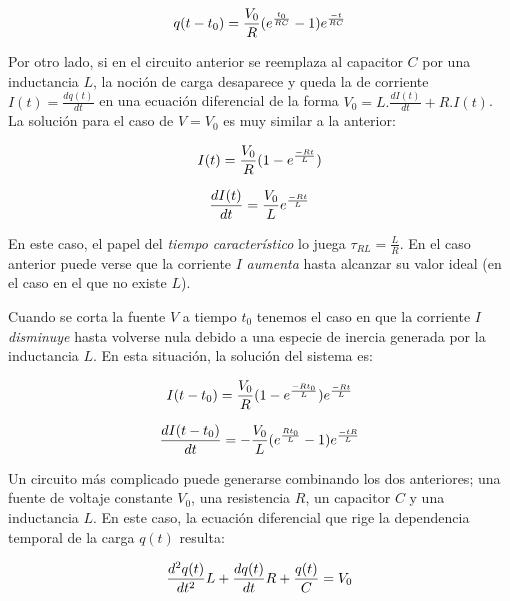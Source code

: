 \documentclass[11pt,a4paper]{article}
\begin{document}
\begin{equation}{\label{RC_descarga_I}}
q(t-t_{0}) = \frac{V_{0}}{R}(e^\frac{t_{0}}{RC}-1)e^\frac{-t}{RC}
\end{equation}

Por otro lado, si en el circuito anterior se reemplaza al capacitor $C$ por una inductancia $L$, la noción de carga desaparece y queda la de corriente $I(t) = \frac{dq(t)}{dt}$ en una ecuación diferencial de la forma $V_{0} = L.\frac{dI(t)}{dt}+R.I(t)$. La solución para el caso de $V= V_0$ es muy similar a la anterior:

\begin{equation}{\label{RL_carga_I}}
I(t)=\frac{V_0}{R}(1-e^\frac{-Rt}{L})
\end{equation}

\begin{equation}{\label{RL_carga}}
\dfrac{dI(t)}{dt}=\frac{V_{0}}{L}e^\frac{-Rt}{L}
\end{equation}

En este caso, el papel del \textit{tiempo característico} lo juega $\tau_{RL}=\frac{L}{R}$. En el caso anterior puede verse que la corriente $I$ \textit{aumenta} hasta alcanzar su valor ideal (en el caso en el que no existe $L$).

Cuando se corta la fuente $V$ a tiempo $t_{0}$ tenemos el caso en que la corriente $I$ \textit{disminuye} hasta volverse nula debido a una especie de inercia generada por la inductancia $L$. En esta situación, la solución del sistema es: 

\begin{equation}{\label{RL_descarga_I}}
I(t-t_0)= \frac{V_{0}}{R}(1-e^\frac{-Rt_0}{L})e^\frac{-Rt}{L}
\end{equation}

\begin{equation}{\label{RL_descarga}}
\dfrac{dI(t-t_{0})}{dt}=-\frac{V_{0}}{L}(e^\frac{Rt_{0}}{L}-1)e^\frac{-tR}{L}
\end{equation}


Un circuito más complicado puede generarse combinando los dos anteriores; una fuente de voltaje constante $V_0$, una resistencia $R$, un capacitor $C$ y una inductancia $L$. En este caso, la ecuación diferencial que rige la dependencia temporal de la carga $q(t)$ resulta:

\begin{equation}{\label{ec_RCL}}
\frac{d^2q(t)}{dt^2}L+\frac{dq(t)}{dt}R+\frac{q(t)}{C} = V_0
\end{equation}
\end{document}
